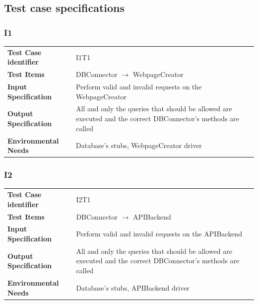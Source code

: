 \documentclass{article}
\begin{document}
\subsection{Test case specifications}
\subsubsection{I1}
\begin{adjustbox}{width=1.2\textwidth}	
	\begin{tabular}{*{2}{p{}}}
		\toprule
		\textbf{Test Case identifier} & I1T1\\
		\textbf{Test Items} & DBConnector $\rightarrow$ WebpageCreator\\
		\textbf{Input Specification} & Perform valid and invalid requests on the WebpageCreator\\
		\textbf{Output Specification} & All and only the queries that should be allowed are executed and the correct DBConnector's methods are called\\
		\textbf{Environmental Needs} & Database's stubs, WebpageCreator driver\\
		\bottomrule
	\end{tabular}
\end{adjustbox}
\subsubsection{I2}
\begin{adjustbox}{width=1.2\textwidth}	
	\begin{tabular}{*{2}{p{}}}
		\toprule
		\textbf{Test Case identifier} & I2T1\\
		\textbf{Test Items} & DBConnector $\rightarrow$ APIBackend\\
		\textbf{Input Specification} & Perform valid and invalid requests on the APIBackend\\
		\textbf{Output Specification} & All and only the queries that should be allowed are executed and the correct DBConnector's methods are called\\
		\textbf{Environmental Needs} & Database's stubs, APIBackend driver\\
		\bottomrule
	\end{tabular}
\end{adjustbox}
\end{document}
